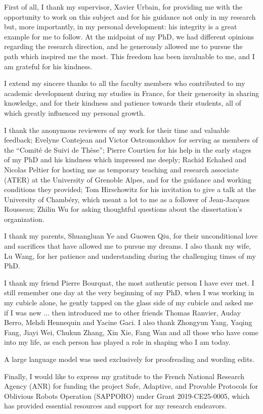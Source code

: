 

First of all, I thank my supervisor, Xavier Urbain, for providing me with the opportunity to work on this subject and for his guidance not only in my research but, more importantly, in my personal development: his integrity is a great example for me to follow. At the midpoint of my PhD, we had different opinions regarding the research direction, and he generously allowed me to pursue the path which inspired me the most. This freedom has been invaluable to me, and I am grateful for his kindness.

I extend my sincere thanks to all the faculty members who contributed to my academic development during my studies in France, for their generosity in sharing knowledge, and for their kindness and patience towards their students, all of which greatly influenced my personal growth.

I thank the anonymous reviewers of my work for their time and valuable feedback; Evelyne Contejean and Victor Ostromoukhov for serving as members of the \enquote{Comité de Suivi de Thèse}; Pierre Courtieu for his help in the early stages of my PhD and his kindness which impressed me deeply; Rachid Echahed and Nicolas Peltier for hosting me as temporary teaching and research associate (ATER) at the University of Grenoble Alpes,
 and for the guidance and working conditions they provided;
Tom Hirschowitz for his invitation to give a talk at the University of Chambéry, which meant a lot to me as a follower of Jean-Jacques Rousseau; Zhilin Wu for asking thoughtful questions about the dissertation's organization.

I thank my parents, Shuangluan Ye and Guowen Qiu, for their unconditional love and sacrifices that have allowed me to pursue my dreams. I also thank my wife, Lu Wang, for her patience and understanding during the challenging times of my PhD.

I thank my friend Pierre Bourquat, the most authentic person I have ever met. I still remember one day at the very beginning of my PhD, when I was working in my cubicle alone, he gently tapped on the glass side of my cubicle and asked me if I was new ... then introduced me to other friends Thomas Ranvier, Auday Berro, Mehdi Hennequin and Yacine Gaci. I also thank Zhongyun Yang, Yaqing Fang, Jiayi Wei, Chukun Zhang, Xin Xie, Fang Wan and all those who have come into my life, as each person has played a role in shaping who I am today.

A large language model was used exclusively for proofreading and wording edits.

Finally, I would like to express my gratitude to the French National Research Agency (ANR) for funding the project Safe, Adaptive, and Provable Protocols for Oblivious Robots Operation (SAPPORO) under Grant 2019-CE25-0005, which has provided essential resources and support for my research endeavors.  
